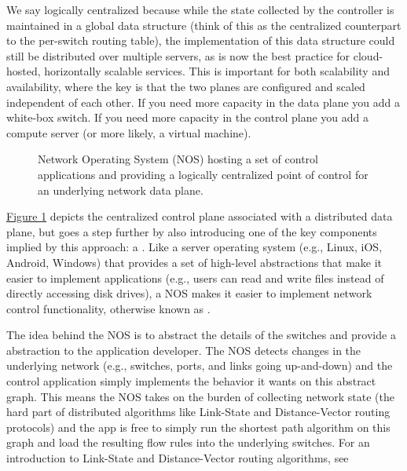 \documentclass[letterpaper,11pt,english]{sphinxmanual}
\let\sphinxpxdimen\pdfpxdimen\else\newdimen\sphinxpxdimen
\begin{document}
We say logically centralized because while the state collected by the
controller is maintained in a global data structure (think of this as
the centralized counterpart to the per-switch routing table), the
implementation of this data structure could still be distributed over
multiple servers, as is now the best practice for cloud-hosted,
horizontally scalable services. This is important for both scalability
and availability, where the key is that the two planes are configured
and scaled independent of each other. If you need more capacity in the
data plane you add a white-box switch. If you need more capacity in
the control plane you add a compute server (or more likely, a virtual
machine).

\begin{figure}[htbp]
\centering
\capstart

\noindent\sphinxincludegraphics[width=500\sphinxpxdimen]{{Slide5}.png}
\caption{Network Operating System (NOS) hosting a set of control
applications and providing a logically centralized point of
control for an underlying network data plane.}\label{\detokenize{intro:id14}}\label{\detokenize{intro:fig-nos}}\end{figure}

\hyperref[\detokenize{intro:fig-nos}]{Figure \ref{\detokenize{intro:fig-nos}}} depicts the centralized control plane
associated with a distributed data plane, but goes a step further by
also introducing one of the key components implied by this approach: a
. Like a server operating system (e.g.,
Linux, iOS, Android, Windows) that provides a set of high-level
abstractions that make it easier to implement applications (e.g.,
users can read and write files instead of directly accessing disk
drives), a NOS makes it easier to implement network control
functionality, otherwise known as .

The idea behind the NOS is to abstract the details of the switches and
provide a  abstraction to the application developer. The
NOS detects changes in the underlying network (e.g., switches, ports,
and links going up-and-down) and the control application simply
implements the behavior it wants on this abstract graph. This means
the NOS takes on the burden of collecting network state (the hard part
of distributed algorithms like Link-State and Distance-Vector routing
protocols) and the app is free to simply run the shortest path
algorithm on this graph and load the resulting flow rules into the
underlying switches.  For an introduction to Link-State and
Distance-Vector routing algorithms, see
\end{document}
